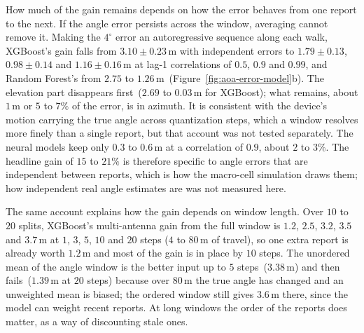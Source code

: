 How much of the gain remains depends on how the error behaves from one report to the next. If the angle error persists across the window, averaging cannot remove it. Making the $4^\circ$ error an autoregressive sequence along each walk, XGBoost's gain falls from $3.10 \pm 0.23\,\text{m}$ with independent errors to $1.79 \pm 0.13$, $0.98 \pm 0.14$ and $1.16 \pm 0.16\,\text{m}$ at lag-1 correlations of $0.5$, $0.9$ and $0.99$, and Random Forest's from $2.75$ to $1.26\,\text{m}$~(Figure~\ref{fig:aoa-error-model}b). The elevation part disappears first~($2.69$ to $0.03\,\text{m}$ for XGBoost); what remains, about $1\,\text{m}$ or $5$ to $7\%$ of the error, is in azimuth. It is consistent with the device's motion carrying the true angle across quantization steps, which a window resolves more finely than a single report, but that account was not tested separately. The neural models keep only $0.3$ to $0.6\,\text{m}$ at a correlation of $0.9$, about $2$ to $3\%$. The headline gain of $15$ to $21\%$ is therefore specific to angle errors that are independent between reports, which is how the macro-cell simulation draws them; how independent real angle estimates are was not measured here.

The same account explains how the gain depends on window length. Over $10$ to $20$ splits, XGBoost's multi-antenna gain from the full window is $1.2$, $2.5$, $3.2$, $3.5$ and $3.7\,\text{m}$ at $1$, $3$, $5$, $10$ and $20$ steps ($4$ to $80\,\text{m}$ of travel), so one extra report is already worth $1.2\,\text{m}$ and most of the gain is in place by $10$ steps. The unordered mean of the angle window is the better input up to $5$ steps~($3.38\,\text{m}$) and then fails~($1.39\,\text{m}$ at $20$ steps) because over $80\,\text{m}$ the true angle has changed and an unweighted mean is biased; the ordered window still gives $3.6\,\text{m}$ there, since the model can weight recent reports. At long windows the order of the reports does matter, as a way of discounting stale ones.
